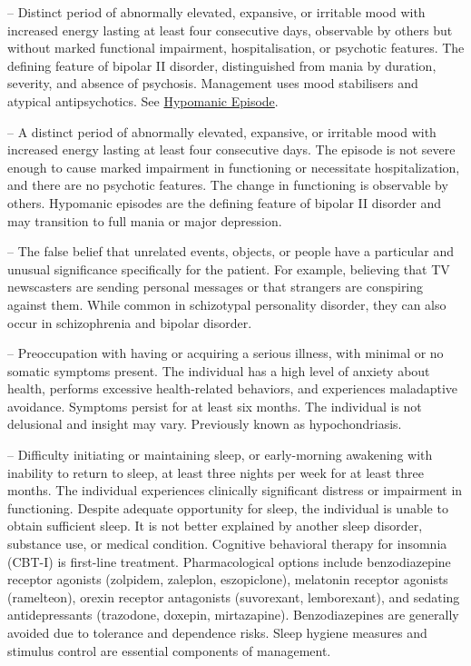 -- Distinct period of abnormally elevated, expansive, or irritable mood with increased energy lasting at least four consecutive days, observable by others but without marked functional impairment, hospitalisation, or psychotic features. The defining feature of bipolar II disorder, distinguished from mania by duration, severity, and absence of psychosis. Management uses mood stabilisers and atypical antipsychotics. See \hyperlink{Hypomanic Episode}{Hypomanic Episode}.

-- A distinct period of abnormally elevated, expansive, or irritable mood with increased energy lasting at least four consecutive days. The episode is not severe enough to cause marked impairment in functioning or necessitate hospitalization, and there are no psychotic features. The change in functioning is observable by others. Hypomanic episodes are the defining feature of bipolar II disorder and may transition to full mania or major depression.

-- The false belief that unrelated events, objects, or people have a particular and unusual significance specifically for the patient. For example, believing that TV newscasters are sending personal messages or that strangers are conspiring against them. While common in schizotypal personality disorder, they can also occur in schizophrenia and bipolar disorder.

-- Preoccupation with having or acquiring a serious illness, with minimal or no somatic symptoms present. The individual has a high level of anxiety about health, performs excessive health-related behaviors, and experiences maladaptive avoidance. Symptoms persist for at least six months. The individual is not delusional and insight may vary. Previously known as hypochondriasis.

-- Difficulty initiating or maintaining sleep, or early-morning awakening with inability to return to sleep, at least three nights per week for at least three months. The individual experiences clinically significant distress or impairment in functioning. Despite adequate opportunity for sleep, the individual is unable to obtain sufficient sleep. It is not better explained by another sleep disorder, substance use, or medical condition. Cognitive behavioral therapy for insomnia (CBT-I) is first-line treatment. Pharmacological options include benzodiazepine receptor agonists (zolpidem, zaleplon, eszopiclone), melatonin receptor agonists (ramelteon), orexin receptor antagonists (suvorexant, lemborexant), and sedating antidepressants (trazodone, doxepin, mirtazapine). Benzodiazepines are generally avoided due to tolerance and dependence risks. Sleep hygiene measures and stimulus control are essential components of management.

